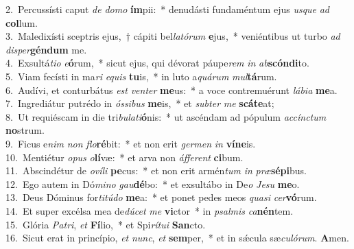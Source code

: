 {2.~}Percussísti caput \textit{de} \textit{do}\textit{mo} \textbf{ím}pii:~* denudásti fundaméntum ejus \textit{us}\textit{que} \textit{ad} \textbf{col}lum.\\
{3.~}Maledixísti sceptris ejus,~† cápiti bel\textit{la}\textit{tó}\textit{rum} \textbf{e}jus,~* veniéntibus ut turbo \textit{ad} \textit{di}\textit{sper}\textbf{gén}\textbf{dum} me.\\
{4.~}Exsultá\textit{ti}\textit{o} \textit{e}\textbf{ó}rum,~* sicut ejus, qui dévorat páupe\textit{rem} \textit{in} \textit{ab}\textbf{scón}\textbf{di}to.\\
{5.~}Viam fecísti in ma\textit{ri} \textit{e}\textit{quis} \textbf{tu}is,~* in luto a\textit{quá}\textit{rum} \textit{mul}\textbf{tá}rum.\\
{6.~}Audívi, et conturbátus \textit{est} \textit{ven}\textit{ter} \textbf{me}us:~* a voce contremuérunt \textit{lá}\textit{bi}\textit{a} \textbf{me}a.\\
{7.~}Ingrediátur putrédo in \textit{ós}\textit{si}\textit{bus} \textbf{me}is,~* et \textit{sub}\textit{ter} \textit{me} \textbf{scá}\textbf{te}at;\\
{8.~}Ut requiéscam in die tri\textit{bu}\textit{la}\textit{ti}\textbf{ó}nis:~* ut ascéndam ad pópulum \textit{ac}\textit{cín}\textit{ctum} \textbf{no}strum.\\
{9.~}Ficus e\textit{nim} \textit{non} \textit{flo}\textbf{ré}bit:~* et non erit \textit{ger}\textit{men} \textit{in} \textbf{ví}\textbf{ne}is.\\
{10.~}Mentiétur \textit{o}\textit{pus} \textit{o}\textbf{lí}væ:~* et arva non \textit{áf}\textit{fe}\textit{rent} \textbf{ci}bum.\\
{11.~}Abscindétur de \textit{o}\textit{ví}\textit{li} \textbf{pe}cus:~* et non erit armén\textit{tum} \textit{in} \textit{præ}\textbf{sé}\textbf{pi}bus.\\
{12.~}Ego autem in Dó\textit{mi}\textit{no} \textit{gau}\textbf{dé}bo:~* et exsultábo in De\textit{o} \textit{Je}\textit{su} \textbf{me}o.\\
{13.~}Deus Dóminus for\textit{ti}\textit{tú}\textit{do} \textbf{me}a:~* et ponet pedes meos \textit{qua}\textit{si} \textit{cer}\textbf{vó}rum.\\
{14.~}Et super excélsa mea de\textit{dú}\textit{cet} \textit{me} \textbf{vi}ctor~* in \textit{psal}\textit{mis} \textit{ca}\textbf{nén}tem.\\
{15.~}Glória \textit{Pa}\textit{tri}, \textit{et} \textbf{Fí}lio,~* et Spi\textit{rí}\textit{tu}\textit{i} \textbf{San}cto.\\
{16.~}Sicut erat in princípio, \textit{et} \textit{nunc}, \textit{et} \textbf{sem}per,~* et in sǽcula sæ\textit{cu}\textit{ló}\textit{rum}. \textbf{A}men.\\
